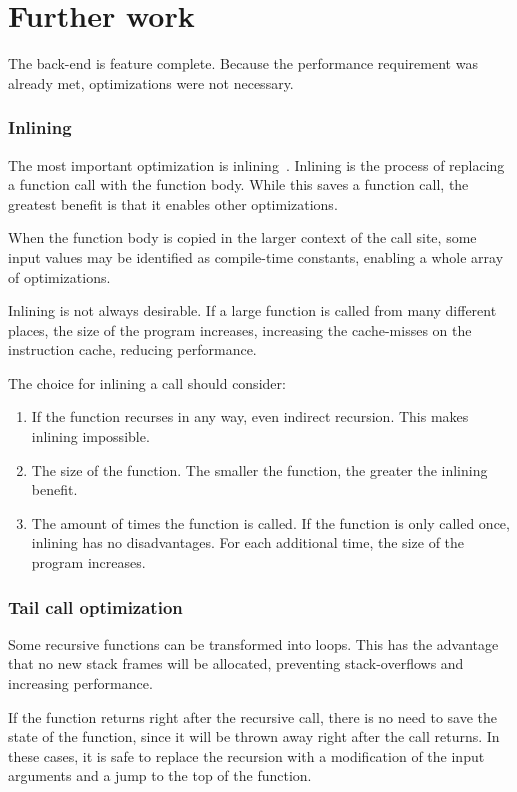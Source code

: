 \section{Further work}\label{recommendations}
The back-end is feature complete.
Because the performance requirement was already met, optimizations were not necessary.

\subsubsection{Inlining}
The most important optimization is inlining~\cite{inlining}.
Inlining is the process of replacing a function call with the function body.
While this saves a function call, the greatest benefit is that it enables other optimizations.

When the function body is copied in the larger context of the call site, some input values may be identified as compile-time constants, enabling a whole array of optimizations. 

Inlining is not always desirable.
If a large function is called from many different places, the size of the program increases, increasing the cache-misses on the instruction cache, reducing performance.

The choice for inlining a call should consider:
\begin{enumerate}
    \item If the function recurses in any way, even indirect recursion.
        This makes inlining impossible.
    \item The size of the function.
        The smaller the function, the greater the inlining benefit.
    \item The amount of times the function is called.
        If the function is only called once, inlining has no disadvantages.
        For each additional time, the size of the program increases.
\end{enumerate}

\subsubsection{Tail call optimization}
Some recursive functions can be transformed into loops.
This has the advantage that no new stack frames will be allocated, preventing stack-overflows and increasing performance.

If the function returns right after the recursive call, there is no need to save the state of the function, since it will be thrown away right after the call returns.
In these cases, it is safe to replace the recursion with a modification of the input arguments and a jump to the top of the function.

